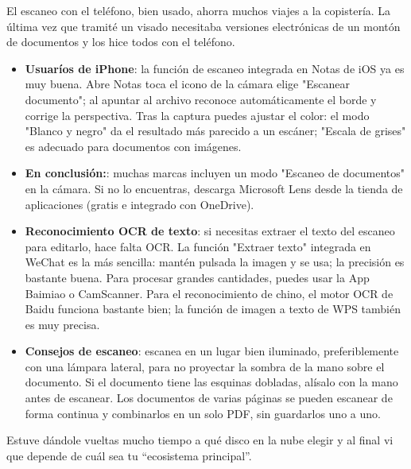 
El escaneo con el teléfono, bien usado, ahorra muchos viajes a la copistería. La última vez que tramité un visado necesitaba versiones electrónicas de un montón de documentos y los hice todos con el teléfono.

\begin{itemize}
  \item \textbf{Usuaríos de iPhone}: la función de escaneo integrada en Notas de iOS ya es muy buena. Abre Notas toca el icono de la cámara elige "Escanear documento"; al apuntar al archivo reconoce automáticamente el borde y corrige la perspectiva. Tras la captura puedes ajustar el color: el modo "Blanco y negro" da el resultado más parecido a un escáner; "Escala de grises" es adecuado para documentos con imágenes.
  \item \textbf{En conclusión:}: muchas marcas incluyen un modo "Escaneo de documentos" en la cámara. Si no lo encuentras, descarga Microsoft Lens desde la tienda de aplicaciones (gratis e integrado con OneDrive).
  \item \textbf{Reconocimiento OCR de texto}: si necesitas extraer el texto del escaneo para editarlo, hace falta OCR. La función "Extraer texto" integrada en WeChat es la más sencilla: mantén pulsada la imagen y se usa; la precisión es bastante buena. Para procesar grandes cantidades, puedes usar la App Baimiao o CamScanner. Para el reconocimiento de chino, el motor OCR de Baidu funciona bastante bien; la función de imagen a texto de WPS también es muy precisa.
  \item \textbf{Consejos de escaneo}: escanea en un lugar bien iluminado, preferiblemente con una lámpara lateral, para no proyectar la sombra de la mano sobre el documento. Si el documento tiene las esquinas dobladas, alísalo con la mano antes de escanear. Los documentos de varias páginas se pueden escanear de forma continua y combinarlos en un solo PDF, sin guardarlos uno a uno.
\end{itemize}


Estuve dándole vueltas mucho tiempo a qué disco en la nube elegir y al final vi que depende de cuál sea tu “ecosistema principal”.


